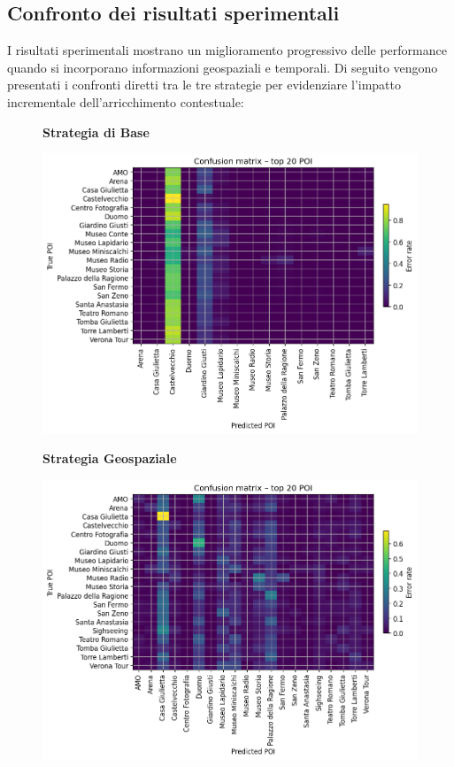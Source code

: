 \begin{itemize}
\subsection{Confronto dei risultati sperimentali}

I risultati sperimentali mostrano un miglioramento progressivo delle performance quando si incorporano informazioni geospaziali e temporali. Di seguito vengono presentati i confronti diretti tra le tre strategie per evidenziare l'impatto incrementale dell'arricchimento contestuale:

\begin{figure}[htbp]
\centering
\begin{minipage}{0.48\textwidth}
\centering
\textbf{Strategia di Base}\par
\vspace{0.3em}
\includegraphics[width=\textwidth]{../../img/llama3.1_8b/no_SPACE-GEO_n-1_come_current_POI/confusion_matrix.png}
\end{minipage}
\hfill
\begin{minipage}{0.48\textwidth}
\centering
\textbf{Strategia Geospaziale}\par
\vspace{0.3em}
\includegraphics[width=\textwidth]{../../img/llama3.1_8b/SPACE-GEO_n-1_come_current_POI/confusion_matrix.png}

\end{minipage}
\end{figure}
\end{itemize}
